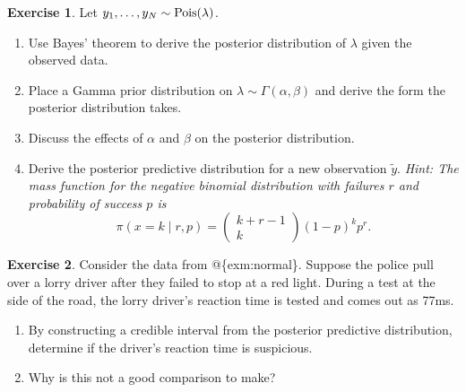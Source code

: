 \documentclass[
]{book}
\providecommand{\tightlist}{%
  \setlength{\itemsep}{0pt}\setlength{\parskip}{0pt}}
\theoremstyle{definition}
\theoremstyle{definition}
\theoremstyle{definition}
\newtheorem{exercise}{Exercise}[chapter]
\theoremstyle{definition}
\theoremstyle{remark}
\begin{document}
\begin{exercise}

Let \(y_1, \ldots, y_N \sim \hbox{Pois}(\lambda)\).

\begin{enumerate}
\def\labelenumi{\arabic{enumi}.}
\tightlist
\item
  Use Bayes' theorem to derive the posterior distribution of \(\lambda\) given the observed data.
\item
  Place a Gamma prior distribution on \(\lambda \sim \Gamma(\alpha, \beta)\) and derive the form the posterior distribution takes.
\item
  Discuss the effects of \(\alpha\) and \(\beta\) on the posterior distribution.
\item
  Derive the posterior predictive distribution for a new observation \(\tilde{y}\). \emph{Hint: The mass function for the negative binomial distribution with failures \(r\) and probability of success \(p\) is }
  \[
  \pi(x = k \mid r, p) = \begin{pmatrix} k + r - 1 \\ k \end{pmatrix} (1-p)^k p^r.
   \]
\end{enumerate}

\end{exercise}

\begin{exercise}

Consider the data from @\{exm:normal\}. Suppose the police pull over a lorry driver after they failed to stop at a red light. During a test at the side of the road, the lorry driver's reaction time is tested and comes out as 77ms.

\begin{enumerate}
\def\labelenumi{\arabic{enumi}.}
\tightlist
\item
  By constructing a credible interval from the posterior predictive distribution, determine if the driver's reaction time is suspicious.
\item
  Why is this not a good comparison to make?
\end{enumerate}

\end{exercise}
\end{document}
